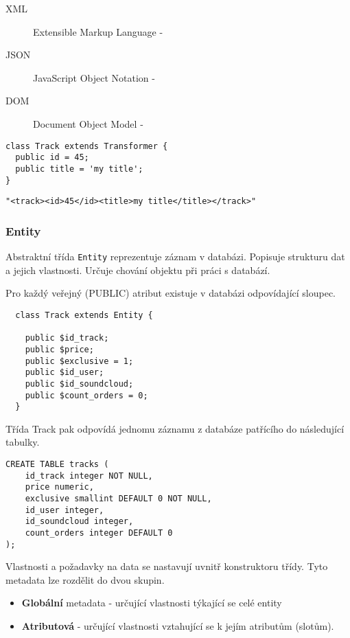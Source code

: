 \documentclass[12pt]{article}
\begin{document}
\begin{description}

  \item[XML] Extensible Markup Language -
  \item[JSON] JavaScript Object Notation -
  \item[DOM] Document Object Model - 

\end{description}


\begin{lstlisting}
class Track extends Transformer {
  public id = 45;
  public title = 'my title';
}
\end{lstlisting}

\begin{lstlisting}
"<track><id>45</id><title>my title</title></track>"
\end{lstlisting}

\subsubsection{Entity}
Abstraktní třída \verb|Entity| reprezentuje záznam v databázi. Popisuje strukturu dat a jejich vlastnosti. Určuje chování objektu při práci s databází.

Pro každý veřejný (PUBLIC) atribut existuje v databázi odpovídající sloupec.

\lstset{language=PHP}
\begin{lstlisting}
  class Track extends Entity {

    public $id_track;
    public $price;
    public $exclusive = 1;
    public $id_user;
    public $id_soundcloud;
    public $count_orders = 0;
  }
\end{lstlisting}

Třída Track pak odpovídá jednomu záznamu z databáze patřícího do  následující tabulky.

\lstset{language=SQL}
\begin{lstlisting}
CREATE TABLE tracks (
    id_track integer NOT NULL,
    price numeric,
    exclusive smallint DEFAULT 0 NOT NULL,
    id_user integer,
    id_soundcloud integer,
    count_orders integer DEFAULT 0
);
\end{lstlisting}

Vlastnosti a požadavky na data se nastavují uvnitř konstruktoru třídy. Tyto metadata lze rozdělit do dvou skupin.
\begin{itemize} 
\item \textbf{Globální} metadata - určující vlastnosti týkající se celé entity
\item \textbf{Atributová} - určující vlastnosti vztahující se k jejím atributům (slotům).
\end{itemize}
\end{document}
